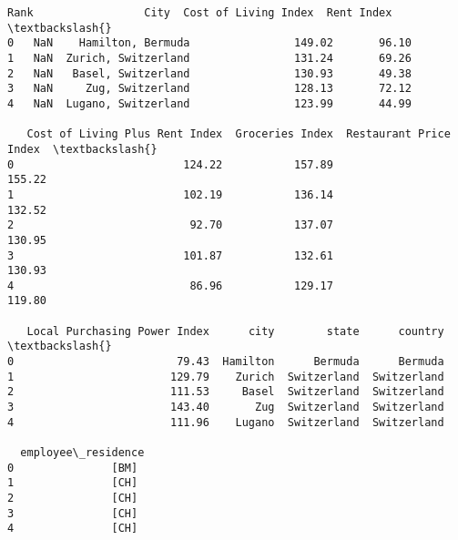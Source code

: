 \documentclass[11pt]{article}
\begin{document}
    \begin{Verbatim}[commandchars=\\\{\}]
   Rank                 City  Cost of Living Index  Rent Index  \textbackslash{}
0   NaN    Hamilton, Bermuda                149.02       96.10
1   NaN  Zurich, Switzerland                131.24       69.26
2   NaN   Basel, Switzerland                130.93       49.38
3   NaN     Zug, Switzerland                128.13       72.12
4   NaN  Lugano, Switzerland                123.99       44.99

   Cost of Living Plus Rent Index  Groceries Index  Restaurant Price Index  \textbackslash{}
0                          124.22           157.89                  155.22
1                          102.19           136.14                  132.52
2                           92.70           137.07                  130.95
3                          101.87           132.61                  130.93
4                           86.96           129.17                  119.80

   Local Purchasing Power Index      city        state      country  \textbackslash{}
0                         79.43  Hamilton      Bermuda      Bermuda
1                        129.79    Zurich  Switzerland  Switzerland
2                        111.53     Basel  Switzerland  Switzerland
3                        143.40       Zug  Switzerland  Switzerland
4                        111.96    Lugano  Switzerland  Switzerland

  employee\_residence
0               [BM]
1               [CH]
2               [CH]
3               [CH]
4               [CH]
    \end{Verbatim}
\end{document}
